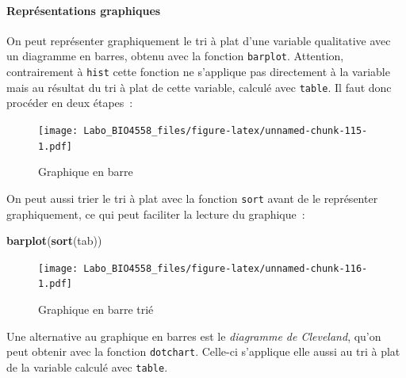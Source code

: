 \documentclass[12pt,]{book}
\newenvironment{Shaded}{\begin{snugshade}}{\end{snugshade}}
\newcommand{\KeywordTok}[1]{\textcolor[rgb]{0.27,0.27,0.27}{\textbf{#1}}}
\newcommand{\NormalTok}[1]{#1}
\newcommand{\OperatorTok}[1]{\textcolor[rgb]{0.43,0.43,0.43}{\textbf{#1}}}
\newcommand{\StringTok}[1]{\textcolor[rgb]{0.5,0.5,0.5}{#1}}
\let\oldparagraph\paragraph
\renewcommand{\paragraph}[1]{\oldparagraph{#1}\mbox{}}
\begin{document}
\hypertarget{repruxe9sentations-graphiques}{%
\paragraph{Représentations graphiques}\label{repruxe9sentations-graphiques}}

On peut représenter graphiquement le tri à plat d'une variable qualitative avec un diagramme en barres, obtenu avec la fonction \texttt{barplot}. Attention, contrairement à \texttt{hist} cette fonction ne s'applique pas directement à la variable mais au résultat du tri à plat de cette variable, calculé avec \texttt{table}. Il faut donc procéder en deux étapes~:

\begin{Shaded}
\end{Shaded}

\begin{figure}
\centering
\texttt{[image: Labo\_BIO4558\_files/figure-latex/unnamed-chunk-115-1.pdf]}
\caption{\label{fig:unnamed-chunk-115}Graphique en barre}
\end{figure}

On peut aussi trier le tri à plat avec la fonction \texttt{sort} avant de le représenter graphiquement, ce qui peut faciliter la lecture du graphique~:

\begin{Shaded}
\begin{Highlighting}[]
\KeywordTok{barplot}\NormalTok{(}\KeywordTok{sort}\NormalTok{(tab))}
\end{Highlighting}
\end{Shaded}

\begin{figure}
\centering
\texttt{[image: Labo\_BIO4558\_files/figure-latex/unnamed-chunk-116-1.pdf]}
\caption{\label{fig:unnamed-chunk-116}Graphique en barre trié}
\end{figure}

Une alternative au graphique en barres est le \emph{diagramme de Cleveland}, qu'on peut obtenir avec la fonction \texttt{dotchart}. Celle-ci s'applique elle aussi au tri à plat de la variable calculé avec \texttt{table}.

\begin{Shaded}
\end{Shaded}
\end{document}
